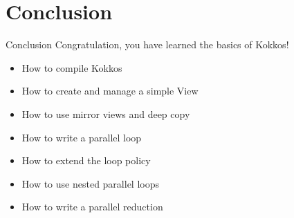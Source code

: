 \documentclass[aspectratio=169]{beamer}
\begin{document}
\section[Conclusion]{Conclusion}


\begin{frame}{Conclusion}
    Congratulation, you have learned the basics of Kokkos!

    \begin{itemize}
        \item How to compile Kokkos
        \item How to create and manage a simple View
        \item How to use mirror views and deep copy
        \item How to write a parallel loop
        \item How to extend the loop policy
        \item How to use nested parallel loops
        \item How to write a parallel reduction
    \end{itemize}
\end{frame}
\end{document}
